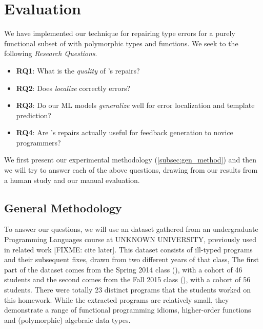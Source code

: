 \section{Evaluation}
\label{sec:eval}

We have implemented our technique for repairing type errors for a purely
functional subset of \ocaml with polymorphic types and functions. We seek to the
following \emph{Research Questions}.

\begin{itemize}
    \item \textbf{RQ1}: What is the \emph{quality} of \toolname's repairs?
    \item \textbf{RQ2}: Does \toolname \emph{localize} correctly errors?
    \item \textbf{RQ3}: Do our ML models \emph{generalize} well for error
    localization and template prediction?
    \item \textbf{RQ4}: Are \toolname's repairs actually useful for feedback
    generation to novice programmers?
\end{itemize}

We first present our experimental methodology (\autoref{subsec:gen_method}) and
then we will try to answer each of the above questions, drawing from our results
from a human study and our manual evaluation.


\subsection{General Methodology}
\label{subsec:gen_method}
To answer our questions, we will use an \ocaml dataset gathered from an
undergraduate Programming Languages course at UNKNOWN UNIVERSITY, previously
used in related work [FIXME: cite later]. This dataset consists of ill-typed
programs and their subsequent fixes, drawn from two different years of that
class, The first part of the dataset comes from the Spring 2014 class (\SPRING),
with a cohort of 46 students and the second comes from the Fall 2015 class
(\FALL), with a cohort of 56 students. There were totally 23 distinct programs
that the students worked on this homework. While the extracted programs are
relatively small, they demonstrate a range of functional programming idioms, \eg
higher-order functions and (polymorphic) algebraic data types.

